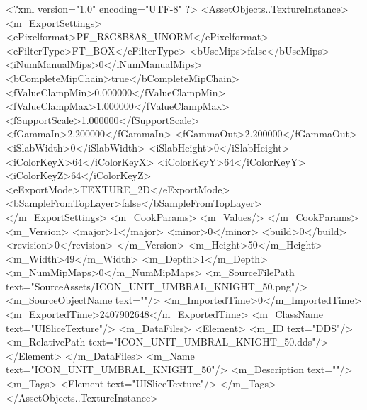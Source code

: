 <?xml version="1.0" encoding="UTF-8" ?>
<AssetObjects..TextureInstance>
	<m_ExportSettings>
		<ePixelformat>PF_R8G8B8A8_UNORM</ePixelformat>
		<eFilterType>FT_BOX</eFilterType>
		<bUseMips>false</bUseMips>
		<iNumManualMips>0</iNumManualMips>
		<bCompleteMipChain>true</bCompleteMipChain>
		<fValueClampMin>0.000000</fValueClampMin>
		<fValueClampMax>1.000000</fValueClampMax>
		<fSupportScale>1.000000</fSupportScale>
		<fGammaIn>2.200000</fGammaIn>
		<fGammaOut>2.200000</fGammaOut>
		<iSlabWidth>0</iSlabWidth>
		<iSlabHeight>0</iSlabHeight>
		<iColorKeyX>64</iColorKeyX>
		<iColorKeyY>64</iColorKeyY>
		<iColorKeyZ>64</iColorKeyZ>
		<eExportMode>TEXTURE_2D</eExportMode>
		<bSampleFromTopLayer>false</bSampleFromTopLayer>
	</m_ExportSettings>
	<m_CookParams>
		<m_Values/>
	</m_CookParams>
	<m_Version>
		<major>1</major>
		<minor>0</minor>
		<build>0</build>
		<revision>0</revision>
	</m_Version>
	<m_Height>50</m_Height>
	<m_Width>49</m_Width>
	<m_Depth>1</m_Depth>
	<m_NumMipMaps>0</m_NumMipMaps>
	<m_SourceFilePath text="SourceAssets/ICON_UNIT_UMBRAL_KNIGHT_50.png"/>
	<m_SourceObjectName text=""/>
	<m_ImportedTime>0</m_ImportedTime>
	<m_ExportedTime>2407902648</m_ExportedTime>
	<m_ClassName text="UISliceTexture"/>
	<m_DataFiles>
		<Element>
			<m_ID text="DDS"/>
			<m_RelativePath text="ICON_UNIT_UMBRAL_KNIGHT_50.dds"/>
		</Element>
	</m_DataFiles>
	<m_Name text="ICON_UNIT_UMBRAL_KNIGHT_50"/>
	<m_Description text=""/>
	<m_Tags>
		<Element text="UISliceTexture"/>
	</m_Tags>
</AssetObjects..TextureInstance>

